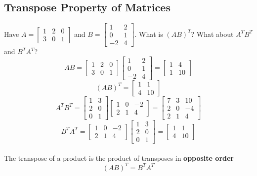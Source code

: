 \subsection{Transpose Property of Matrices}
Have $A = \begin{bmatrix}
  1 & 2 & 0 \\
  3 & 0 & 1
\end{bmatrix}$ and $B = \begin{bmatrix}
  1 & 2 \\
  0 & 1 \\
  -2 & 4
\end{bmatrix}$. What is $(AB)^T$? What about $A^TB^T$ and $B^TA^T$?
\[
  AB = \begin{bmatrix}
    1 & 2 & 0 \\
    3 & 0 & 1
  \end{bmatrix} \begin{bmatrix}
    1 & 2 \\
    0 & 1 \\
    -2 & 4
  \end{bmatrix} = \begin{bmatrix}
    1 & 4 \\
    1 & 10
  \end{bmatrix}
\]
\[
  (AB)^T = \begin{bmatrix}
    1 & 1 \\
    4 & 10
  \end{bmatrix}
\]
\[
  A^TB^T = \begin{bmatrix}
    1 & 3 \\
    2 & 0 \\
    0 & 1
  \end{bmatrix} \begin{bmatrix}
    1 & 0 & -2 \\
    2 & 1 & 4
  \end{bmatrix} = \begin{bmatrix}
    7 & 3 & 10 \\
    2 & 0 & -4 \\
    2 & 1 & 4
  \end{bmatrix}
\]
\[
  B^TA^T = \begin{bmatrix}
    1 & 0 & -2 \\
    2 & 1 & 4
  \end{bmatrix} \begin{bmatrix}
    1 & 3 \\
    2 & 0 \\
    0 & 1
  \end{bmatrix} = \begin{bmatrix}
    1 & 1 \\
    4 & 10
  \end{bmatrix}
\]
\\[8pt]
The transpose of a product is the product of transposes in \textbf{opposite order}
\[
  (AB)^T = B^TA^T
\]
